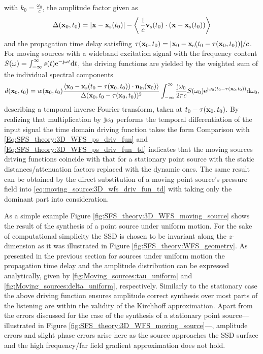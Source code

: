 with $k_0 = \frac{\omega_0}{c}$, the amplitude factor given as
\begin{equation}
\Delta( \mathbf{x}_0,t_0 ) = |\mathbf{x} - \mathbf{x}_{\mathrm{s}}(t_0)| - \left<\, \frac{1}{c}\mathbf{v}_{\mathrm{s}}(t_0) \cdot (\mathbf{x} - \mathbf{x}_{\mathrm{s}}(t_0)) \right> 
\end{equation}
and the propagation time delay satisfíing $\tau(\mathbf{x}_0,t_0) = | \mathbf{x}_0 - \mathbf{x}_{\mathrm{s}}( t_0 - \tau(\mathbf{x}_0,t_0)) | / c$.
For moving sources with a wideband excitation signal with the frequency content $S(\omega) = \int_{-\infty}^{\infty} s(t) \mathrm{e}^{-\mathrm{j} \omega t} \mathrm{d} t$, the driving functions are yielded by the weighted sum of the individual spectral components
\begin{equation}
d(\mathbf{x}_0,t_0) =  w(\mathbf{x}_0,t_0)  
\frac{\left< \mathbf{x}_0 -\mathbf{x}_{\mathrm{s}}(t_0-\tau(\mathbf{x}_0,t_0)) \cdot \mathbf{n}_{\mathrm{in}}(\mathbf{x}_0) \right>}{\Delta(\mathbf{x}_0,t_0-\tau(\mathbf{x}_0,t_0))^2}
\int_{-\infty}^{\infty} \frac{\mathrm{j} \omega_0}{2\pi c} S(\omega_0 )\mathrm{e}^{\mathrm{j} \omega_0\left( t_0 - \tau( \mathbf{x}_0,t_0 )\right)} \mathrm{d} \omega_0,
\end{equation}
describing a temporal inverse Fourier transform, taken at $t_0 - \tau( \mathbf{x}_0,t_0 )$.
By realizing that multiplication by $\mathrm{j} \omega_0$ performs the temporal differentiation of the input signal the time domain driving function takes the form
Comparison with \eqref{Eq:SFS_theory:3D_WFS_ps_driv_fun} and \eqref{Eq:SFS_theory:3D_WFS_ps_driv_fun_td} indicates that the moving sources driving functions coincide with that for a stationary point source with the static distances/attenuation factors replaced with the dynamic ones.
The same result can be obtained by the direct substitution of a moving point source's pressure field into \eqref{eq:moving_source:3D_wfs_driv_fun_td} with taking only the dominant part into consideration.

As a simple example Figure \ref{fig:SFS_theory:3D_WFS_moving_source} shows the result of the synthesis of a point source under uniform motion.
For the sake of computational simplicity the SSD is chosen to be invariant along the $z$-dimension as it was illustrated in Figure \ref{fig:SFS_theory:WFS_geometry}.
As presented in the previous section for sources under uniform motion the propagation time delay and the amplitude distribution can be expressed analytically, given by \eqref{fig:Moving_sources:tau_uniform} and \eqref{fig:Moving_sources:delta_uniform}, respectively.
Similarly to the stationary case the above driving function ensures amplitude correct synthesis over most parts of the listening are within the validity of the Kirchhoff approximation.
Apart from the errors discussed for the case of the synthesis of a stationary point source---illustrated in Figure \ref{fig:SFS_theory:3D_WFS_moving_source}---, amplitude errors and slight phase errors arise here as the source approaches the SSD surface and the high frequency/far field gradient approximation does not hold.

